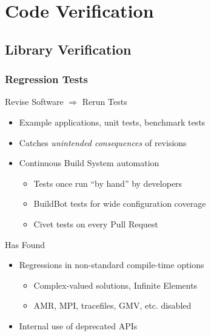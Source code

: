 \section{Code Verification}

\subsection{Library Verification}

\begin{frame}
\frametitle{Regression Tests}
\begin{block}{Revise Software $\Rightarrow$ Rerun Tests}
\begin{itemize}
\item Example applications, unit tests, benchmark tests
\item Catches {\textit{unintended consequences}} of revisions
\item Continuous Build System automation
\begin{itemize}
\item Tests once run ``by hand'' by \libMesh{} developers
\item BuildBot tests for wide configuration coverage
\item Civet tests on every Pull Request
\end{itemize}
\end{itemize}
\end{block}

\pause

\begin{block}{Has Found}
\begin{itemize}
\item Regressions in non-standard compile-time options
  \begin{itemize}
  \item Complex-valued solutions, Infinite Elements
  \item AMR, MPI, tracefiles, GMV, etc. disabled
  \end{itemize}
\item Internal use of deprecated APIs
\end{itemize}
\end{block}
\end{frame}


